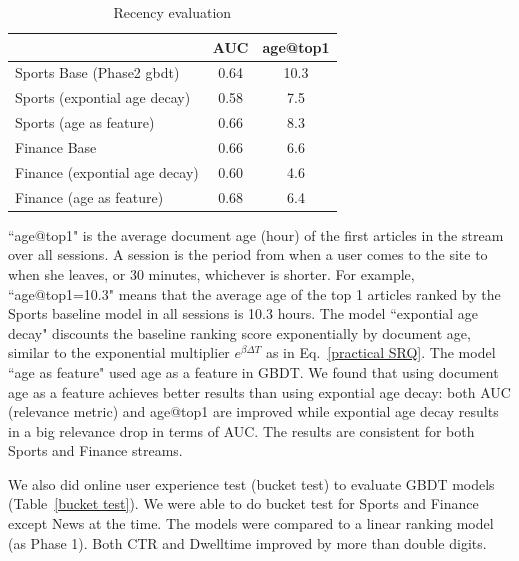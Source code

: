 \begin{table} 
\caption{ Recency evaluation }\label{recency}
\begin{tabular}{|p{50mm}|c|c|}\hline
     & AUC & age@top1 \\ \hline
Sports Base (Phase2 gbdt) &  0.64 & 10.3  \\ \hline
Sports (expontial age decay) & 0.58 & 7.5 \\ \hline
Sports (age as feature) & 0.66  & 8.3 \\ \hline \hline
Finance Base & 0.66 & 6.6 \\ \hline
Finance (expontial age decay) & 0.60 & 4.6 \\ \hline
Finance (age as feature)  & 0.68 & 6.4 \\ \hline
\end{tabular}

\end{table}

``age@top1" is the average document age (hour) of the first articles in the 
stream over all sessions. A session is the period from when a user comes to 
the site to when she leaves, or 30 minutes, whichever is shorter. 
For example, ``age@top1=10.3" means that the average age of the top 1 articles ranked  by  the Sports baseline model in all sessions is 10.3 
hours. The model ``expontial age decay" discounts the baseline ranking score 
exponentially by document age, similar to the exponential multiplier $e^{\beta 
\Delta T}$ as in Eq.~\eqref{practical SRQ}. The model ``age as feature" used 
age as a feature in GBDT. 
We found that using document age as a feature achieves better results than 
using expontial age decay: both AUC (relevance metric) and age@top1 are 
improved while expontial age decay results in a big relevance drop in terms of 
AUC.
The results are consistent for both Sports and Finance streams. 


We also did online user experience test (bucket test) to evaluate GBDT models 
(Table~\ref{bucket test}). We were able to do bucket test for Sports and 
Finance except News at the time. The models were compared to a linear ranking model (as 
Phase 1). Both CTR and Dwelltime improved by more than double digits. 

